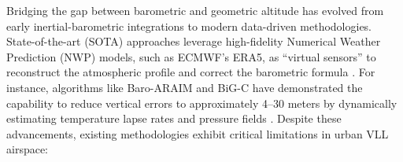 


Bridging the gap between barometric and geometric altitude has evolved from early inertial-barometric integrations to modern data-driven methodologies. State-of-the-art (SOTA) approaches leverage high-fidelity Numerical Weather Prediction (NWP) models, such as ECMWF's ERA5, as ``virtual sensors'' to reconstruct the atmospheric profile and correct the barometric formula \cite{schumann2017use}. For instance, algorithms like Baro-ARAIM and BiG-C have demonstrated the capability to reduce vertical errors to approximately 4--30 meters by dynamically estimating temperature lapse rates and pressure fields \cite{simonetti2024geodetic, narayanan2022enhanced}. Despite these advancements, existing methodologies exhibit critical limitations in urban VLL airspace:

